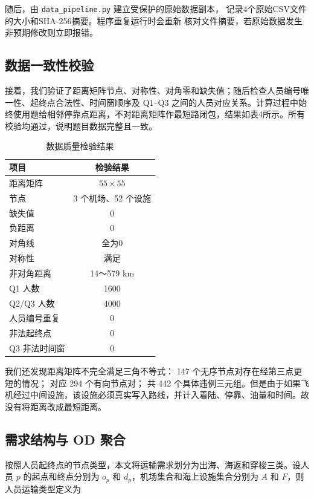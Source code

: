 \documentclass[UTF8,a4paper,zihao=5]{ctexart}
\begin{document}
随后，由 \texttt{data\_pipeline.py} 建立受保护的原始数据副本，
记录4个原始CSV文件的大小和SHA-256摘要。程序重复运行时会重新
核对文件摘要，若原始数据发生非预期修改则立即报错。
\subsection{数据一致性校验}

接着，我们验证了距离矩阵节点、对称性、对角零和缺失值；随后检查人员编号唯一性、起终点合法性、时间窗顺序及 Q1--Q3 之间的人员对应关系。计算过程中始终使用题给相邻停靠点距离，不对距离矩阵作最短路闭包，结果如表4所示。所有校验均通过，说明题目数据完整且一致。

\begin{table}[htbp]
  \centering
  \caption{数据质量检验结果}
  \label{tab:data-process-true}
  \begin{tabular}{lc}
    \toprule
    项目 & 检验结果  \\
    \midrule
    距离矩阵 & $55\times55$ \\
    节点 & 3 个机场、52 个设施  \\
    缺失值 & 0  \\
    负距离 & 0  \\
    对角线 & 全为0  \\
    对称性 & 满足  \\
    非对角距离 & 14～579 km  \\
    Q1 人数 & 1600  \\
    Q2/Q3 人数 & 4000  \\
    人员编号重复 & 0  \\
    非法起终点 & 0  \\
    Q3 非法时间窗 & 0  \\

    \bottomrule
  \end{tabular}
\end{table}

我们还发现距离矩阵不完全满足三角不等式：
147 个无序节点对存在经第三点更短的情况；
对应 294 个有向节点对；
共 442 个具体违例三元组。但是由于如果飞机经过中间设施，该设施必须真实写入路线，并计入着陆、停靠、油量和时间。故没有将距离改成最短距离。
\subsection{需求结构与 OD 聚合}

按照人员起终点的节点类型，本文将运输需求划分为出海、海返和穿梭三类。设人员 $p$ 的起点和终点分别为 $o_p$ 和 $d_p$，机场集合和海上设施集合分别为 $A$ 和 $F$，则人员运输类型定义为
\end{document}

